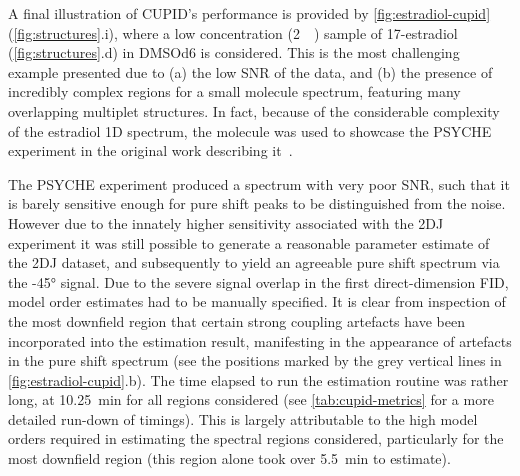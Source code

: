 A final illustration of \ac{CUPID}'s performance is provided by
\cref{fig:estradiol-cupid} (\cref{fig:structures}.i),
where a low concentration (\qty{2}{\milli\molar}) sample of
17\textbeta-estradiol (\cref{fig:structures}.d) in \acs{DMSOd6} is
considered. This is the most challenging example presented due
to (a) the low \ac{SNR} of the data, and (b) the presence of incredibly complex
regions for a small molecule spectrum, featuring many overlapping
multiplet structures. In fact, because of the considerable complexity
of the estradiol \ac{1D} spectrum, the molecule was used to showcase the
\ac{PSYCHE} experiment in the original work describing
it~\cite{Foroozandeh2014}.

The \ac{PSYCHE} experiment produced a spectrum with very poor
\ac{SNR}, such that it is barely sensitive enough for pure shift peaks to be
distinguished from the noise. However due to the innately higher
sensitivity associated with the \ac{2DJ} experiment it was still possible to
generate a reasonable parameter estimate of the \ac{2DJ} dataset, and
subsequently to yield an agreeable pure shift spectrum via the \ang{-45}
signal. Due to the severe signal overlap in the first
direct-dimension \ac{FID}, model order estimates had to be
manually specified. It is clear from inspection of the most downfield region
that certain strong coupling artefacts have been incorporated into the
estimation result, manifesting in the appearance of artefacts in the pure shift
spectrum (see the positions marked by the grey vertical lines in
\cref{fig:estradiol-cupid}.b).
The time elapsed to run the estimation routine was rather
long, at \qty{10.25}{\minute} for all regions considered (see
\cref{tab:cupid-metrics} for a more detailed run-down of timings). This is
largely attributable to the high model orders required in estimating the
spectral regions considered, particularly for the most downfield region (this
region alone took over \qty{5.5}{\minute} to estimate).
